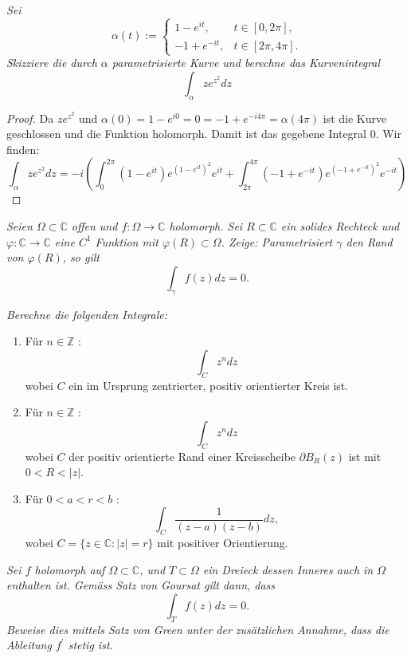 \documentclass[11pt]{article}
\newenvironment{problem}[2][Beispiel]{
    \begin{trivlist}
        \item[\hskip \labelsep {\bfseries #1}\hskip \labelsep {\bfseries #2.}] \itshape}{
    \end{trivlist}\normalshape
}
\begin{document}
    \begin{problem}{2}
        Sei
        $$
        \alpha(t):= \begin{cases}1-e^{i t}, & t \in[0,2 \pi], \\ -1+e^{-i t}, & t \in[2 \pi, 4 \pi] .
        \end{cases}
        $$
        Skizziere die durch $\alpha$ parametrisierte Kurve und berechne das Kurvenintegral
        $$
        \int_\alpha z e^{z^2} d z
        $$
    \end{problem}

    \begin{proof}
        Da $ze^{z^2}$ und $\alpha(0) = 1-e ^{i0} = 0 = -1+e^{-i 4\pi} = \alpha(4\pi)$ ist die Kurve geschlossen
        und die Funktion holomorph. Damit ist das gegebene Integral $0$.
        Wir finden:
        $$\int_\alpha z e^{z^2} dz = -i\left(
        \int_{0}^{2\pi}(1-e^{i t})e^{(1-e^{i t})^2}e^{i t}+\int_{2\pi}^{4\pi}(-1+e^{-i t})e^{(-1+e^{-i t})^2}e^{-i t}\right)$$
    \end{proof}

    \begin{problem}{3}
        Seien $\Omega \subset \mathbb{C}$ offen und $f: \Omega \rightarrow \mathbb{C}$ holomorph. Sei $R \subset \mathbb{C}$ ein solides Rechteck und $\varphi: \mathbb{C} \rightarrow \mathbb{C}$ eine $C^1$ Funktion mit $\varphi(R) \subset \Omega$. Zeige: Parametrisiert $\gamma$ den Rand von $\varphi(R)$, so gilt
        $$
        \int_\gamma f(z) d z=0 .
        $$
    \end{problem}

    \begin{problem}{4}
        Berechne die folgenden Integrale:
        \begin{enumerate}[label = (\alph*)]
            \item Für $n \in \mathbb{Z}$ :
            $$
            \int_C z^n d z
            $$
            wobei $C$ ein im Ursprung zentrierter, positiv orientierter Kreis ist.
            \item Für $n \in \mathbb{Z}$ :
            $$
            \int_C z^n d z
            $$
            wobei $C$ der positiv orientierte Rand einer Kreisscheibe $\partial B_R(z)$ ist mit $0<R<|z|$.
            \item Für $0<a<r<b$ :
            $$
            \int_C \frac{1}{(z-a)(z-b)} d z,
            $$
            wobei $C=\{z \in \mathbb{C}:|z|=r\}$ mit positiver Orientierung.
        \end{enumerate}
    \end{problem}

    \begin{problem}{5}
        Sei $f$ holomorph auf $\Omega \subset \mathbb{C}$, und $T \subset \Omega$ ein Dreieck dessen
        Inneres auch in $\Omega$ enthalten ist. Gemäss Satz von Goursat gilt dann, dass
        $$
        \int_T f(z) d z=0 .
        $$
        Beweise dies mittels Satz von Green unter der zusätzlichen Annahme, dass die Ableitung $f^{\prime}$
        stetig ist.
    \end{problem}
\end{document}

